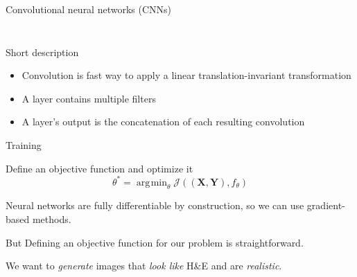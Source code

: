 \documentclass[t]{beamer}
\newcommand{\tensor}[1]{\mathbf{#1}}
\DeclareMathOperator*{\argmin}{arg\!\min}
\begin{document}
\begin{frame}{Convolutional neural networks (CNNs)}
\begin{columns}
\begin{column}{0.6\textwidth}
\begin{figure}
\end{figure}
\end{column}

\end{columns}

\begin{block}{Short description}
\begin{itemize}
\item Convolution is fast way to apply a linear translation-invariant transformation
\item<5-> A layer contains multiple filters
\item<5-> A layer's output is the concatenation of each resulting convolution
\end{itemize}
\end{block}

\end{frame}

\begin{frame}{Training}

\begin{block}{Define an objective function and optimize it}
\[
\theta^* = \argmin_{\theta} \mathcal{J}
\left( (\tensor{X}, \tensor{Y}), f_{\theta} \right)
\]

Neural networks are fully differentiable by construction, so we can use gradient-based methods.
\end{block}\pause

\begin{alertblock}{But}
Defining an objective function for our problem is straightforward.

We want to \emph{generate} images that \emph{look like} H\&E and are \emph{realistic}.
\end{alertblock}

\end{frame}
\end{document}
